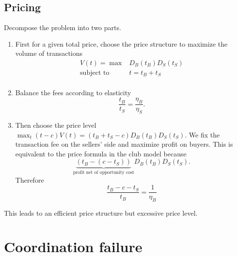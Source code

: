 \subsection{Pricing}
Decompose the problem into two parts.
\begin{enumerate}
    \item First for a given total price, choose the price structure to maximize the volume of transactions \begin{equation*}
        \begin{array}{rl}
            V(t)=\max & D_B(t_B)D_S(t_S)\\
             \text{subject to}& t=t_B+t_S\\
        \end{array}
    \end{equation*}
    \item Balance the fees according to elasticity \begin{equation*}
        \frac{t_B}{t_S}=\frac{\eta_B}{\eta_S}.
    \end{equation*}
    \item Then choose the price level $\max_t (t-c)V(t)=(t_B+t_S-c) D_B(t_B)D_S(t_S)$. We fix the transaction fee on the sellers’ side and maximize profit on buyers. This is equivalent to the price formula in the club model because \begin{equation*}
        \underbrace{(t_B-(c-t_S))}_\text{profit net of opportunity cost} D_B(t_B)D_S(t_S).
    \end{equation*} Therefore \begin{equation*}
        \frac{t_B-c-t_S}{t_B}= \frac{1}{\eta_B}
    \end{equation*}
\end{enumerate}
\begin{remark}
    This leads to an efficient price structure but excessive price level.
\end{remark}
\section{Coordination failure}
